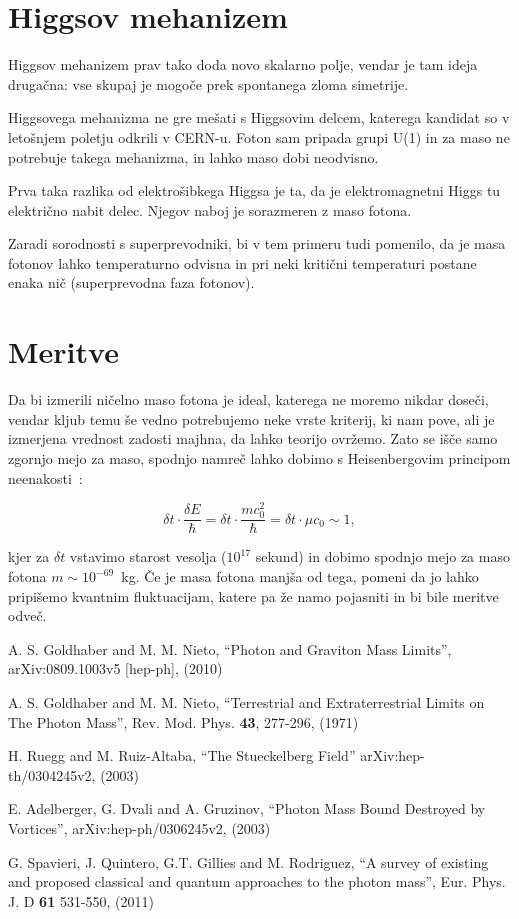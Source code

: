 \documentclass[a4paper, twocolumn, titlepage]{article}
\begin{document}
\section{Higgsov mehanizem}

Higgsov mehanizem prav tako doda novo skalarno polje, vendar je tam ideja druga\v cna: vse skupaj je mogo\v ce prek
spontanega zloma simetrije.

Higgsovega mehanizma ne gre me\v sati s Higgsovim delcem, katerega kandidat so v leto\v snjem poletju odkrili v CERN-u.
Foton sam pripada grupi U(1) in za maso ne potrebuje takega mehanizma, in lahko maso dobi neodvisno.

Prva taka razlika od elektro\v sibkega Higgsa je ta, da je elektromagnetni Higgs tu elektri\v cno nabit delec. Njegov
naboj je sorazmeren z maso fotona.

Zaradi sorodnosti s superprevodniki, bi v tem primeru tudi pomenilo, da je masa fotonov lahko temperaturno odvisna in pri
neki kriti\v cni temperaturi postane enaka ni\v c (superprevodna faza fotonov).

\section{Meritve}

Da bi izmerili ni\v celno maso fotona je ideal, katerega ne moremo nikdar dose\v ci, vendar kljub temu \v se vedno
potrebujemo neke vrste kriterij, ki nam pove, ali je izmerjena vrednost zadosti majhna, da lahko teorijo ovr\v zemo.
Zato se i\v s\v ce samo zgornjo mejo za maso, spodnjo namre\v c lahko dobimo s Heisenbergovim principom
neenakosti~\cite{over}:

\begin{equation}
	\delta t \cdot \frac{\delta E}{\hbar} = \delta t \cdot \frac{mc_0^2}{\hbar} = \delta t \cdot \mu c_0 \sim 1,
\end{equation}

kjer za $\delta t$ vstavimo starost vesolja ($10^{17}$ sekund) in dobimo spodnjo mejo za maso fotona \hbox{$m \sim
10^{-69}$ kg}.
\v Ce je masa fotona manj\v sa od tega, pomeni da jo lahko pripi\v semo kvantnim fluktuacijam, katere pa \v ze namo
pojasniti in bi bile meritve odve\v c.

\begin{thebibliography}{9}
	A. S. Goldhaber and M. M. Nieto,
	"`Photon and Graviton Mass Limits"',
	arXiv:0809.1003v5 [hep-ph],
	(2010)

	A. S. Goldhaber and M. M. Nieto,
	"`Terrestrial and Extraterrestrial Limits on The Photon Mass"',
	Rev. Mod. Phys. {\bf 43}, 277-296,
	(1971)

	H. Ruegg and M. Ruiz-Altaba,
	"`The Stueckelberg Field"'
	arXiv:hep-th/0304245v2,
	(2003)

	E. Adelberger, G. Dvali and A. Gruzinov,
	"`Photon Mass Bound Destroyed by Vortices"',
	arXiv:hep-ph/0306245v2,
	(2003)

	G. Spavieri, J. Quintero, G.T. Gillies and M. Rodriguez,
	"`A survey of existing and proposed classical and quantum approaches to the photon mass"',
	Eur. Phys. J. D {\bf 61} 531-550,
	(2011)
\end{thebibliography}
\end{document}

